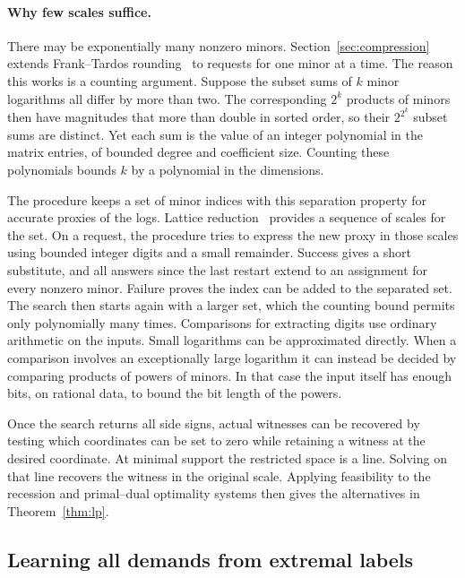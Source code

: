 \paragraph{Why few scales suffice.}
There may be exponentially many nonzero minors. Section~\ref{sec:compression}
extends Frank--Tardos rounding~\cite{FT} to requests for one minor at
a time. The reason this works is a counting argument. Suppose the
subset sums of \(k\) minor logarithms all differ by more than two.
The corresponding \(2^k\) products of minors then have magnitudes that
more than double in sorted order, so their \(2^{2^k}\) subset sums
are distinct. Yet each sum is the value of an integer polynomial in
the matrix entries, of bounded degree and coefficient size.
Counting these polynomials bounds \(k\) by a polynomial in the
dimensions.

The procedure keeps a set of minor indices with this separation
property for accurate proxies of the logs. Lattice reduction~\cite{LLL}
provides a sequence of scales for the set. On a request, the procedure
tries to express the new proxy in those scales using bounded integer
digits and a small remainder. Success gives a short substitute, and
all answers since the last restart extend to an assignment for every
nonzero minor. Failure proves the index can be added to the separated
set. The search then starts again with a larger set, which the
counting bound permits only polynomially many times. Comparisons
for extracting digits use ordinary arithmetic on the inputs.
Small logarithms can be approximated directly. When a comparison
involves an exceptionally large logarithm it can instead be decided
by comparing products of powers of minors. In that case the input
itself has enough bits, on rational data, to bound the bit length of
the powers.

Once the search returns all side signs, actual witnesses can be
recovered by testing which coordinates can be set to zero while
retaining a witness at the desired coordinate. At minimal support
the restricted space is a line. Solving on that line recovers the
witness in the original scale. Applying feasibility to the recession
and primal--dual optimality systems then gives the alternatives in
Theorem~\ref{thm:lp}.

\subsection{Learning all demands from extremal labels}

